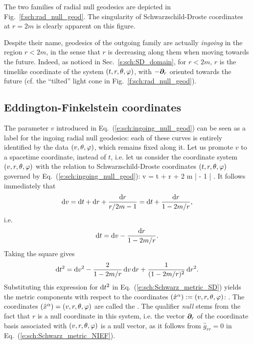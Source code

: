 The two families of radial null geodesics are depicted in
Fig.~\ref{f:sch:rad_null_geod}.
The singularity of Schwarzschild-Droste coordinates at $r=2m$
is clearly apparent on this figure.


\begin{remark}
Despite their name, geodesics of the outgoing family are actually
\emph{ingoing} in the region $r<2m$, in the sense that
$r$ is decreasing along them when moving towards the future. Indeed,
as noticed in Sec.~\ref{s:sch:SD_domain},
for $r<2m$, $r$ is the timelike coordinate of the system $(t,r,\theta,\varphi)$,
with $-\bm{\partial}_r$ oriented towards the future (cf. the ``tilted'' light cone
in Fig.~\ref{f:sch:rad_null_geod}).
\end{remark}

\subsection{Eddington-Finkelstein coordinates} \label{s:sch:EF_coord}

The parameter $v$ introduced in Eq.~(\ref{e:sch:ingoing_null_geod}) can be
seen as a label for the ingoing radial null geodesics: each of these curves is
entirely identified by the data $(v,\theta,\varphi)$, which remains fixed along it.
Let us promote $v$ to a spacetime coordinate, instead of $t$, i.e. let us
consider the coordinate system $(v,r,\theta,\varphi)$ with the relation to
Schwarzschild-Droste coordinates $(t,r,\theta,\varphi)$ governed by Eq.~(\ref{e:sch:ingoing_null_geod}):
\be \label{e:sch:v_t_r}
     v = t + r + 2 m \ln \left|  - 1 \right| .
\ee
It follows immediately that
\[
    \mathrm{d} v = \mathrm{d} t + \mathrm{d} r + \frac{\mathrm{d} r}{r/2m - 1} = \mathrm{d} t + \frac{\mathrm{d} r}{1 - 2m/r} ,
\]
i.e.
\[
    \mathrm{d} t = \mathrm{d} v -  \frac{\mathrm{d} r}{1 - 2m/r} .
\]
Taking the square gives
\[
    \mathrm{d} t^2 = \mathrm{d} v^2 - \frac{2}{1 - 2m/r} \, \mathrm{d} v \, \mathrm{d} r + \frac{1}{(1 - 2m/r)^2}\, \mathrm{d} r^2 .
\]
Substituting this expression for $\mathrm{d} t^2$ in Eq.~(\ref{e:sch:Schwarz_metric_SD})
yields the metric components with respect to the coordinates
$({\hat x}^\alpha) := (v,r,\theta,\varphi)$:
\be \label{e:sch:Schwarz_metric_NIEF}
    .
\ee
The coordinates $({\hat x}^\alpha) = (v,r,\theta,\varphi)$ are called the
. The qualifier \emph{null} stems from the fact that
$r$ is a null coordinate in this system, i.e. the vector $\bm{\partial}_r$ of the coordinate
basis associated with $(v,r,\theta,\varphi)$ is a null
vector, as it follows from ${\hat g}_{rr}=0$ in Eq.~(\ref{e:sch:Schwarz_metric_NIEF}).

